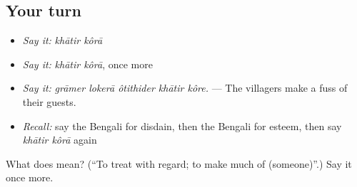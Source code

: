 \subsection*{Your turn}
\begin{itemize}
\raggedright
  \item \emph{Say it:} \emph{khātir kôrā}
  \item \emph{Say it:} \emph{khātir kôrā}, once more
  \item \emph{Say it:} \emph{grāmer lokerā ôtithider khātir kôre.} — The villagers make a fuss of their guests.
  \item \emph{Recall:} say the Bengali for disdain, then the Bengali for esteem, then say \emph{khātir kôrā} again
\end{itemize}

\begin{tcolorbox}[breakable,colback=teal!4,colframe=teal!35!black,title={Before you move on}]
What does   mean? (\textquotedblleft{}To treat with regard; to make much of (someone)\textquotedblright{}.) Say it once more.
\end{tcolorbox}
